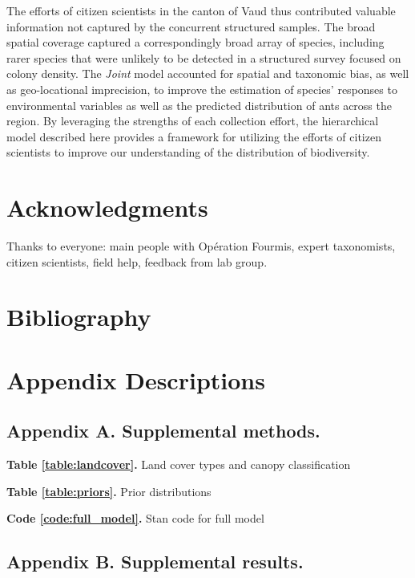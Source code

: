 \documentclass[preprint,review,times,12pt,3p]{elsarticle}
\begin{document}
The efforts of citizen scientists in the canton of Vaud thus contributed valuable information not captured by the concurrent structured samples. The broad spatial coverage captured a correspondingly broad array of species, including rarer species that were unlikely to be detected in a structured survey focused on colony density. The \emph{Joint} model accounted for spatial and taxonomic bias, as well as geo-locational imprecision, to improve the estimation of species' responses to environmental variables as well as the predicted distribution of ants across the region. By leveraging the strengths of each collection effort, the hierarchical model described here provides a framework for utilizing the efforts of citizen scientists to improve our understanding of the distribution of biodiversity.




\section{Acknowledgments}
Thanks to everyone: main people with Opération Fourmis, expert taxonomists, citizen scientists, field help, feedback from lab group.

\newpage
\section{Bibliography}




\newpage
\section{Appendix Descriptions}

\subsection{Appendix A. Supplemental methods.}

\textbf{Table \ref{table:landcover}.} Land cover types and canopy classification

\textbf{Table \ref{table:priors}.} Prior distributions

\textbf{Code \ref{code:full_model}.} Stan code for full model



\subsection{Appendix B. Supplemental results.}
\end{document}
